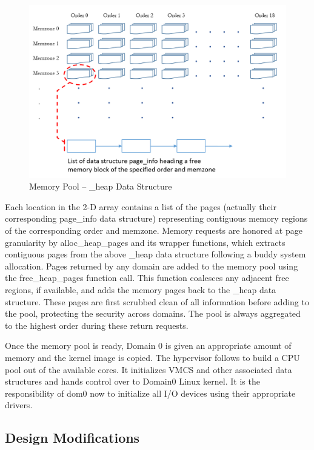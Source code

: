 \begin{figure}[H]
\centering
\includegraphics[scale=0.88]{figures/heap_data_structure.png}
\caption{Memory Pool -- \_heap Data Structure}
\label{fig:heap_struct}
\end{figure}

Each location in the 2-D array contains a list of the pages (actually their corresponding page\_info data structure) representing contiguous memory regions of the corresponding order and memzone. Memory requests are honored at page granularity by alloc\_heap\_pages and its wrapper functions, which extracts contiguous pages from the above \_heap data structure following a buddy system allocation. Pages returned by any domain are added to the memory pool using the free\_heap\_pages function call. This function coalesces any adjacent free regions, if available, and adds the memory pages back to the \_heap data structure. These pages are first scrubbed clean of all information before adding to the pool, protecting the security across domains. The pool is always aggregated to the highest order during these return requests.

Once the memory pool is ready, Domain 0 is given an appropriate amount of memory and the kernel image is copied. The hypervisor follows to build a CPU pool out of the available cores. It initializes VMCS and other associated data structures and hands control over to Domain0 Linux kernel. It is the responsibility of dom0 now to initialize all I/O devices using their appropriate drivers. 

\subsection{Design Modifications}

